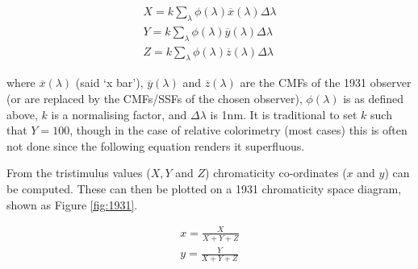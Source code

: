 
\begin{subequations}
\begin{align}
X=k \sum_{\lambda} \phi(\lambda) \overline{x}(\lambda) \Delta \lambda \\ 
Y=k \sum_{\lambda} \phi(\lambda) \overline{y}(\lambda) \Delta \lambda \\ 
Z=k \sum_{\lambda} \phi(\lambda) \overline{z}(\lambda) \Delta \lambda
\end{align}
\label{eq:XYZ}
\end{subequations}

\nopagebreak %

where $\overline{x}(\lambda)$ (said `x bar'), $\overline{y}(\lambda)$ and $\overline{z}(\lambda)$ are the \glspl{CMF} of the 1931 observer (or are replaced by the \Glspl{CMF}/\Glspl{SSF} of the chosen observer), $\phi(\lambda)$ is as defined above, $k$ is a normalising factor, and $\Delta\lambda$ is 1nm. It is traditional to set $k$ such that $Y=100$, though in the case of relative colorimetry (most cases) this is often not done since the following equation renders it superfluous.

From the tristimulus values ($X,Y$ and $Z$) chromaticity co-ordinates ($x$ and $y$) can be computed. These can then be plotted on a 1931 chromaticity space diagram, shown as Figure \ref{fig:1931}.

\begin{subequations}
\begin{align}
x=\frac{X}{X+Y+Z} \\
y=\frac{Y}{X+Y+Z} 
\end{align}
\label{eq:1931chrom}
\end{subequations}






